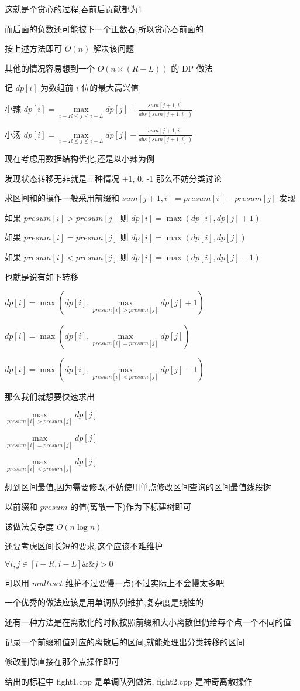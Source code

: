 \documentclass[UTF8]{ctexart}
\begin{document}
这就是个贪心的过程,吞前后贡献都为1

而后面的负数还可能被下一个正数吞,所以贪心吞前面的

按上述方法即可 $O(n)$ 解决该问题

其他的情况容易想到一个 $O(n\times(R-L))$ 的 DP 做法

记 $dp[i]$ 为数组前 $i$ 位的最大高兴值

小辣 $dp[i] = \max\limits_{i-R \leq j \leq i-L}{dp[j]+\frac{sum[j+1, i]}{abs(sum[j+1, i])}}$

小汤 $dp[i] = \max\limits_{i-R \leq j \leq i-L}{dp[j]-\frac{sum[j+1, i]}{abs(sum[j+1, i])}}$

现在考虑用数据结构优化,还是以小辣为例

发现状态转移无非就是三种情况 +1, 0, -1 那么不妨分类讨论

求区间和的操作一般采用前缀和 $sum[j+1,i] = presum[i]-presum[j]$ 发现

如果 $presum[i] > presum[j]$ 则 $dp[i] = \max(dp[i], dp[j]+1)$

如果 $presum[i] = presum[j]$ 则 $dp[i] = \max(dp[i], dp[j])$

如果 $presum[i] < presum[j]$ 则 $dp[i] = \max(dp[i], dp[j]-1)$

也就是说有如下转移

$dp[i] = \max(dp[i], \max\limits_{presum[i] > presum[j]}{dp[j]}+1)$

$dp[i] = \max(dp[i], \max\limits_{presum[i] = presum[j]}{dp[j]})$

$dp[i] = \max(dp[i], \max\limits_{presum[i] < presum[j]}{dp[j]}-1)$

那么我们就想要快速求出

$\max\limits_{presum[i] > presum[j]}{dp[j]}$

$\max\limits_{presum[i] = presum[j]}{dp[j]}$

$\max\limits_{presum[i] < presum[j]}{dp[j]}$

想到区间最值,因为需要修改,不妨使用单点修改区间查询的区间最值线段树

以前缀和 $presum$ 的值(离散一下)作为下标建树即可

该做法复杂度 $O(n\log n)$

还要考虑区间长短的要求,这个应该不难维护

$\forall i, j \in [i-R, i-L] \&\& j > 0$

可以用 $multiset$ 维护不过要慢一点(不过实际上不会慢太多吧

一个优秀的做法应该是用单调队列维护,复杂度是线性的

还有一种方法是在离散化的时候按照前缀和大小离散但仍给每个点一个不同的值

记录一个前缀和值对应的离散后的区间,就能处理出分类转移的区间

修改删除直接在那个点操作即可

给出的标程中 fight1.cpp 是单调队列做法, fight2.cpp 是神奇离散操作
\end{document}
